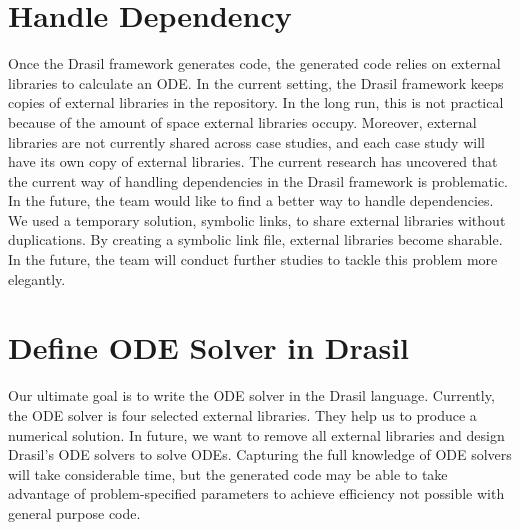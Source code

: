 \section{Handle Dependency}
Once the Drasil framework generates code, the generated code relies on external libraries to calculate an ODE. In the current setting, the Drasil framework keeps copies of external libraries in the repository. In the long run, this is not practical because of the amount of space external libraries occupy. Moreover, external libraries are not currently shared across case studies, and each case study will have its own copy of external libraries. The current research has uncovered that the current way of handling dependencies in the Drasil framework is problematic. In the future, the team would like to find a better way to handle dependencies. We used a temporary solution, symbolic links, to share external libraries without duplications. By creating a symbolic link file, external libraries become sharable. In the future, the team will conduct further studies to tackle this problem more elegantly.

\section{Define ODE Solver in Drasil}
Our ultimate goal is to write the ODE solver in the Drasil language. Currently, the ODE solver is four selected external libraries. They help us to produce a numerical solution. In future, we want to remove all external libraries and design Drasil's ODE solvers to solve ODEs. Capturing the full knowledge of ODE solvers will take considerable time, but the generated code may be able to take advantage of problem-specified parameters to achieve efficiency not possible with general purpose code.
